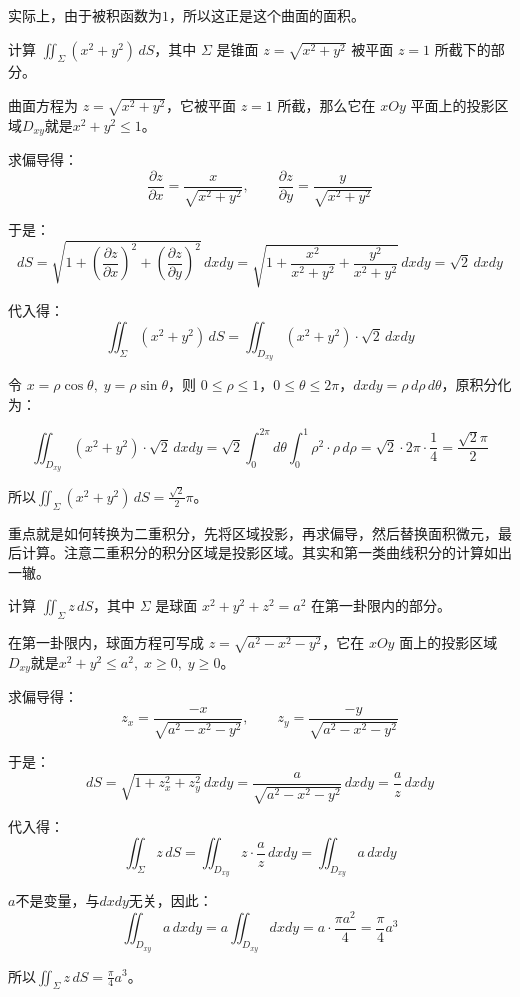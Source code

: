 实际上，由于被积函数为$1$，所以这正是这个曲面的面积。

\begin{myexample}
    计算 \(\iint_{\Sigma}(x^2+y^2)\,dS\)，其中 \(\Sigma\) 是锥面 \(z=\sqrt{x^2+y^2}\) 被平面 \(z=1\) 所截下的部分。

    曲面方程为 \(z=\sqrt{x^2+y^2}\)，它被平面 \(z=1\) 所截，那么它在 \(xOy\) 平面上的投影区域\(D_{xy}\)就是\(x^2+y^2\le 1\)。

    求偏导得：
    \[
\frac{\partial z}{\partial x}= \frac{x}{\sqrt{x^2+y^2}},\qquad
\frac{\partial z}{\partial y}= \frac{y}{\sqrt{x^2+y^2}}
\]

于是：
\[
dS = \sqrt{1+\left(\frac{\partial z}{\partial x}\right)^2+\left(\frac{\partial z}{\partial y}\right)^2}\,dxdy
= \sqrt{1+\frac{x^2}{x^2+y^2}+\frac{y^2}{x^2+y^2}}\,dxdy
= \sqrt{2}\,dxdy
\]

代入得：
\[
\iint_{\Sigma}(x^2+y^2)\,dS
= \iint_{D_{xy}}(x^2+y^2)\cdot\sqrt{2}\,dxdy
\]

令 \(x=\rho\cos\theta,\; y=\rho\sin\theta\)，则 \(0\le \rho\le 1\)，\(0\le\theta\le2\pi\)，\(dxdy = \rho\,d\rho\,d\theta\)，原积分化为：

\[
\iint_{D_{xy}}(x^2+y^2)\cdot\sqrt{2}\,dxdy
= \sqrt{2}\int_0^{2\pi}d\theta\int_0^1 \rho^2\cdot \rho\,d\rho
= \sqrt{2}\cdot 2\pi\cdot \frac{1}{4}
= \frac{\sqrt{2}\pi}{2}
\]

所以\(\iint_{\Sigma}(x^2+y^2)\,dS=\frac{\sqrt{2}}{2}\pi\)。
\end{myexample}

重点就是如何转换为二重积分，先将区域投影，再求偏导，然后替换面积微元，最后计算。注意二重积分的积分区域是投影区域。其实和第一类曲线积分的计算如出一辙。

\begin{myexample}
    计算 \(\iint_{\Sigma} z\,dS\)，其中 \(\Sigma\) 是球面 \(x^2+y^2+z^2=a^2\) 在第一卦限内的部分。

    在第一卦限内，球面方程可写成 \(z=\sqrt{a^2-x^2-y^2}\)，它在 \(xOy\) 面上的投影区域\(D_{xy}\)就是\(x^2+y^2\le a^2,\;x\ge0,\;y\ge0\)。

    求偏导得：
    \[
z_x = \frac{-x}{\sqrt{a^2-x^2-y^2}},\qquad
z_y = \frac{-y}{\sqrt{a^2-x^2-y^2}}
\]

于是：
\[
dS = \sqrt{1+z_x^2+z_y^2}\,dxdy
= \frac{a}{\sqrt{a^2-x^2-y^2}}\,dxdy
= \frac{a}{z}\,dxdy
\]

代入得：
\[
\iint_{\Sigma} z\,dS =\iint_{D_{xy}} z \cdot \frac{a}{z}\,dxdy = \iint_{D_{xy}} a \,dxdy
\]

\(a\)不是变量，与\(dxdy\)无关，因此：
\[
\iint_{D_{xy}} a\,dxdy = a\iint_{D_{xy}}dxdy = a\cdot \frac{\pi a^2}{4}=\frac{\pi}{4} a^3
\]

所以\(\iint_{\Sigma} z\,dS=\frac{\pi}{4} a^3\)。
\end{myexample}

